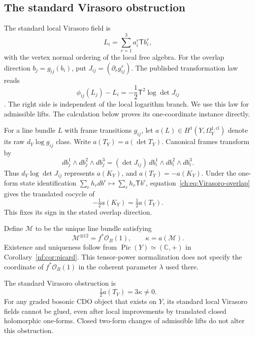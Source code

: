 \subsection{The standard Virasoro obstruction}

The standard local Virasoro field is
\[
                        L_i=\sum_{r=1}^3 a_i^r\mathsf T b_i^r,
\]
with the vertex normal ordering of the local free algebra.
For the overlap direction $b_j=g_{ij}(b_i)$, put
$J_{ij}=(\partial_r g_{ij}^s)$.
The published transformation law reads
\begin{equation}\label{ch:eq:Virasoro-overlap}
       \phi_{ij}(L_j)-L_i
                  =-\frac12\mathsf T^2\log\det J_{ij}
\end{equation}
\cite[Theorem~9.1]{GMSGerbes}.
The right side is independent of the local logarithm branch.
We use this law for admissible lifts.
The calculation below proves its one-coordinate instance directly.

For a line bundle $L$ with frame transitions $g_{ij}$, let
$a(L)\in H^1(Y,\Omega_Y^{1,\mathrm{cl}})$ denote its raw
$d_Y\log g_{ij}$ class.
Write $a(T_Y)=a(\det T_Y)$.
Canonical frames transform by
\[
 db_j^1\wedge db_j^2\wedge db_j^3
        =(\det J_{ij})\,db_i^1\wedge db_i^2\wedge db_i^3.
\]
Thus $d_Y\log\det J_{ij}$ represents $a(K_Y)$, and
$a(T_Y)=-a(K_Y)$.
Under the one-form state identification
$\sum_r h_rdb^r\mapsto\sum_r h_r\mathsf T b^r$,
equation~\eqref{ch:eq:Virasoro-overlap} gives the translated
cocycle of
\begin{equation}\label{ch:eq:conformal-class}
                 -\tfrac12a(K_Y)=\tfrac12a(T_Y).
\end{equation}
This fixes its sign in the stated overlap direction.

Define $\mathcal M$ to be the unique line bundle satisfying
\[
                \mathcal M^{\otimes12}=f^*\mathcal O_B(1),
                \qquad \kappa=a(\mathcal M).
\]
Existence and uniqueness follow from
$\operatorname{Pic}(Y)\simeq(\mathbb C,+)$ in
Corollary~\ref{nf:cor:picard}.
This tensor-power normalization does not specify the coordinate
of $f^*\mathcal O_B(1)$ in the coherent parameter $\lambda$
used there.

\begin{theorem}\label{ch:thm:Virasoro-obstruction}
The standard Virasoro obstruction is
\begin{equation}\label{ch:eq:three-kappa}
                     \tfrac12a(T_Y)=3\kappa\ne0.
\end{equation}
For any graded bosonic CDO object that exists on $Y$, its
standard local Virasoro fields cannot be glued, even after
local improvements by translated closed holomorphic one-forms.
Closed two-form changes of admissible lifts do not alter this
obstruction.
\end{theorem}

